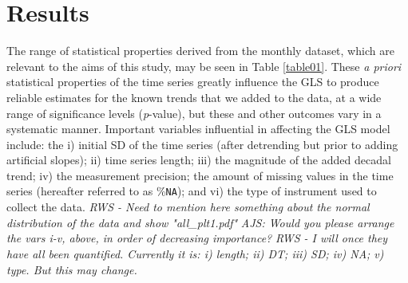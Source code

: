 \documentclass{ametsoc}
\begin{document}
\section{Results}
The range of statistical properties derived from the monthly dataset, which are relevant to the aims of this study, may be seen in Table \ref{table01}. These \emph{a priori} statistical properties of the time series greatly influence the GLS to produce reliable estimates for the known trends that we added to the data, at a wide range of significance levels (\emph{p}-value), but these and other outcomes vary in a systematic manner. Important variables influential in affecting the GLS model include: the i) initial SD of the time series (after detrending but prior to adding artificial slopes); ii) time series length; iii) the magnitude of the added decadal trend; iv) the measurement precision; the amount of missing values in the time series (hereafter referred to as \%\texttt{NA}); and vi) the type of instrument used to collect the data.
\emph{RWS - Need to mention here something about the normal distribution of the data and show "all_plt1.pdf"}
\emph{AJS: Would you please arrange the vars i-v, above, in order of decreasing importance?}
\emph{RWS - I will once they have all been quantified. Currently it is: i) length; ii) DT; iii) SD; iv) NA; v) type. But this may change.}

\end{document}
